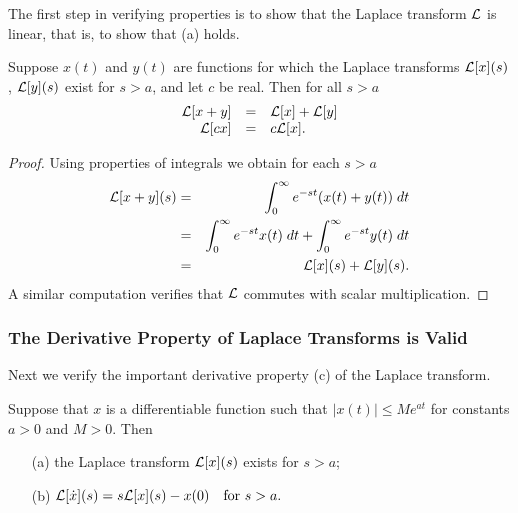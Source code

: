 \documentclass{ximera}
\begin{document}
The first step in verifying properties  is to show that the 
Laplace transform ${\cal L}$ is linear, that is, to 
show that (a) holds.
\begin{prop}  \label{prop:linLap}
Suppose $x(t)$ and $y(t)$ are functions for which the Laplace transforms
${\cal L}[x](s)$, ${\cal L}[y](s)$ exist for $s>a$, and let $c$ be real. 
Then for all $s>a$
\begin{equation}  \label{eq:linLap}
\begin{array}{rcl}
{\cal L}[x + y] &  = & {\cal L}[x] + {\cal L}[y] \\
{\cal L}[cx] & = & c{\cal L}[x].
\end{array}
\end{equation}
\end{prop}

\begin{proof} Using properties of integrals we obtain for each $s>a$
\begin{eqnarray*}
{\cal L}[x+y](s) &=& \int_0^{\infty} e^{-st} (x(t)+y(t))\; dt\\
&=& \int_0^{\infty} e^{-st} x(t)\; dt + \int_0^{\infty} e^{-st} y(t)\; dt\\
&=& {\cal L}[x](s)+ {\cal L}[y](s).
\end{eqnarray*}
A similar computation verifies that ${\cal L}$ commutes with scalar 
multiplication.  \end{proof}

\subsubsection*{The Derivative Property of Laplace Transforms is Valid}

Next we verify the important derivative property (c) of the 
Laplace transform.  

\begin{prop}  \label{prop:derLap}
Suppose that $x$ is a differentiable function such that 
$|x(t)|\le Me^{at}$ for constants $a>0$ and $M>0$.  
Then
\begin{itemize}
\item[(a)] the Laplace transform ${\cal L}[x](s)$ exists for $s>a$; 
\item[(b)] ${\cal L}[\dot x](s) = s{\cal L}[x](s) - x(0) \quad 
\mbox{for $s>a$.}$
\end{itemize}
\end{prop}
\end{document}
